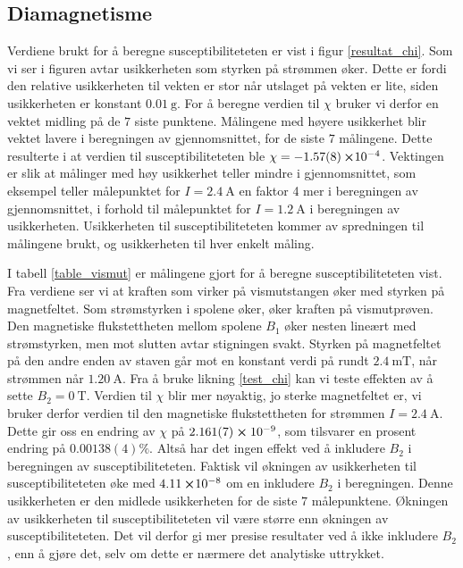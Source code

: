 \documentclass[%
 reprint,
 amsmath,amssymb,
 aps,
 norsk,
]{revtex4-1}
\begin{document}
\subsection{Diamagnetisme}
Verdiene brukt for å beregne susceptibiliteteten er vist i figur \vref{resultat_chi}. Som vi ser i figuren avtar usikkerheten som styrken på strømmen øker. Dette er fordi den relative usikkerheten til vekten er stor når utslaget på vekten er lite, siden usikkerheten er konstant $\SI{0.01}{\gram}$. For å beregne verdien til $\chi$ bruker vi derfor en vektet midling på de $7$ siste punktene. Målingene med høyere usikkerhet blir vektet lavere i beregningen av gjennomsnittet, for de siste $7$ målingene. Dette resulterte i at verdien til susceptibiliteteten ble $\chi = -\SI{1.57\pm0.08}\cross 10^{-4}$. Vektingen er slik at målinger med høy usikkerhet teller mindre i gjennomsnittet, som eksempel teller målepunktet for $I=\SI{2.4}{\ampere}$ en faktor 4 mer i beregningen av gjennomsnittet, i forhold til målepunktet for $I=\SI{1.2}{\ampere}$ i beregningen av usikkerheten. Usikkerheten til susceptibiliteteten kommer av spredningen til målingene brukt, og usikkerheten til hver enkelt måling.\par
I tabell \vref{table_vismut} er målingene gjort for å beregne susceptibiliteteten vist. Fra verdiene ser vi at kraften som virker på vismutstangen øker med styrken på magnetfeltet. Som strømstyrken i spolene øker, øker kraften på vismutprøven. Den magnetiske flukstettheten mellom spolene $B_1$ øker nesten lineært med strømstyrken, men mot slutten avtar stigningen svakt. Styrken på magnetfeltet på den andre enden av staven går mot en konstant verdi på rundt $\SI{2.4}{\milli\tesla}$, når strømmen når $\SI{1.20}{\ampere}$. Fra å bruke likning \eqref{test_chi} kan vi teste effekten av å sette $B_2=\SI{0}{\tesla}$. Verdien til $\chi$ blir mer nøyaktig, jo sterke magnetfeltet er, vi bruker derfor verdien til den magnetiske flukstettheten for strømmen $I=\SI{2.4}{\ampere}$. Dette gir oss en endring av $\chi$
på $2.161(7)\cross10^{-9}$, som tilsvarer en prosent endring på $0.00138(4)\%$. Altså har det ingen effekt ved å inkludere $B_2$ i beregningen av susceptibiliteteten. Faktisk vil økningen av usikkerheten til susceptibiliteteten øke med $\SI{4.11}\cross 10^{-8}$ om en inkludere $B_2$ i beregningen. Denne usikkerheten er den midlede usikkerheten for de siste $7$ målepunktene. Økningen av usikkerheten til susceptibiliteteten vil være større enn økningen av susceptibiliteteten. Det vil derfor gi mer presise resultater ved å ikke inkludere $B_2$, enn å gjøre det, selv om dette er nærmere det analytiske uttrykket. \\
\end{document}
